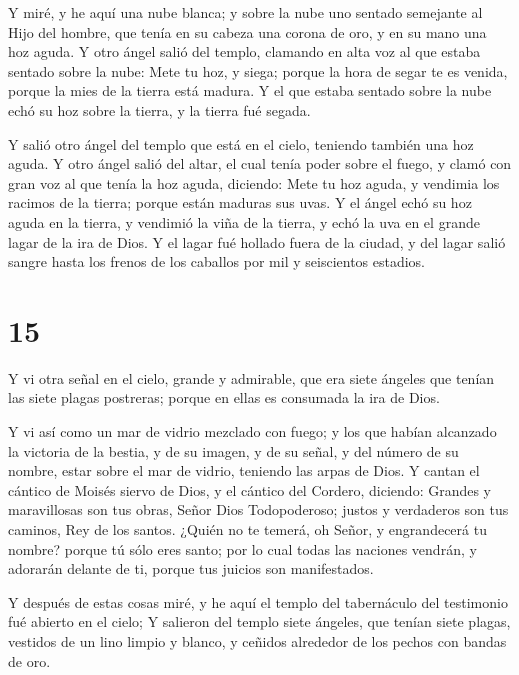  Y miré, y he aquí una nube blanca; y sobre la nube uno
sentado semejante al Hijo del hombre, que tenía en su cabeza una corona
de oro, y en su mano una hoz aguda.  Y otro ángel salió del
templo, clamando en alta voz al que estaba sentado sobre la nube: Mete
tu hoz, y siega; porque la hora de segar te es venida, porque la mies de
la tierra está madura.  Y el que estaba sentado sobre la
nube echó su hoz sobre la tierra, y la tierra fué segada.

 Y salió otro ángel del templo que está en el cielo,
teniendo también una hoz aguda.  Y otro ángel salió del
altar, el cual tenía poder sobre el fuego, y clamó con gran voz al que
tenía la hoz aguda, diciendo: Mete tu hoz aguda, y vendimia los racimos
de la tierra; porque están maduras sus uvas.  Y el ángel
echó su hoz aguda en la tierra, y vendimió la viña de la tierra, y echó
la uva en el grande lagar de la ira de Dios.  Y el lagar
fué hollado fuera de la ciudad, y del lagar salió sangre hasta los
frenos de los caballos por mil y seiscientos estadios.

\hypertarget{section-14}{%
\section{15}\label{section-14}}

 Y vi otra señal en el cielo, grande y admirable, que era
siete ángeles que tenían las siete plagas postreras; porque en ellas es
consumada la ira de Dios.

 Y vi así como un mar de vidrio mezclado con fuego; y los
que habían alcanzado la victoria de la bestia, y de su imagen, y de su
señal, y del número de su nombre, estar sobre el mar de vidrio, teniendo
las arpas de Dios.  Y cantan el cántico de Moisés siervo de
Dios, y el cántico del Cordero, diciendo: Grandes y maravillosas son tus
obras, Señor Dios Todopoderoso; justos y verdaderos son tus caminos, Rey
de los santos.  ¿Quién no te temerá, oh Señor, y
engrandecerá tu nombre? porque tú sólo eres santo; por lo cual todas las
naciones vendrán, y adorarán delante de ti, porque tus juicios son
manifestados.

 Y después de estas cosas miré, y he aquí el templo del
tabernáculo del testimonio fué abierto en el cielo;  Y
salieron del templo siete ángeles, que tenían siete plagas, vestidos de
un lino limpio y blanco, y ceñidos alrededor de los pechos con bandas de
oro.

